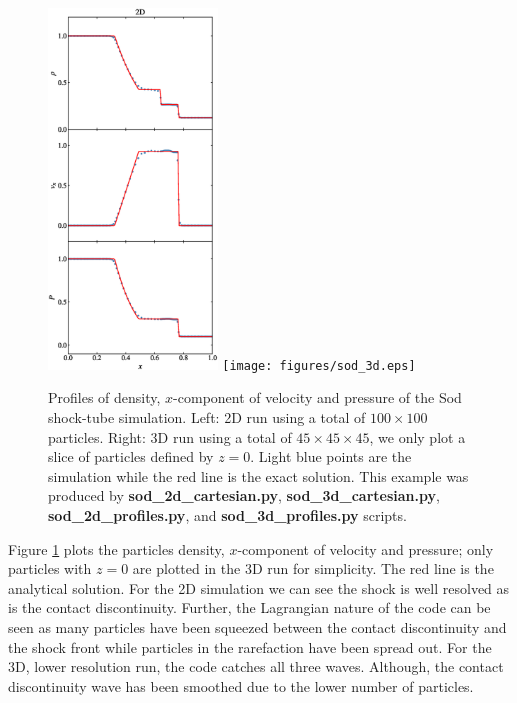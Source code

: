 \begin{figure}
    \begin{center}
        \includegraphics[width=0.4\textwidth]{figures/sod_2d.eps}
        \texttt{[image: figures/sod\_3d.eps]}
        \caption{Profiles of density, $x$-component of velocity and pressure of the Sod 
        shock-tube simulation. Left: 2D run using a total of $100\times100$ particles. Right: 3D run 
        using a total of $45\times45\times45$, we only plot a slice of particles defined by $z=0$.
        Light blue points are the simulation while the red line is the exact solution.
        This example was produced by \textbf{sod\_2d\_cartesian.py},
        \textbf{sod\_3d\_cartesian.py}, \textbf{sod\_2d\_profiles.py}, and 
        \textbf{sod\_3d\_profiles.py} scripts.}
        \label{fig.sod}
    \end{center}
\end{figure}

Figure \ref{fig.sod} plots the particles density, $x$-component of velocity and pressure; only 
particles with $z=0$ are plotted in the 3D run for simplicity. The red line is the analytical 
solution. For the 2D simulation we can see the shock is well resolved as is the contact 
discontinuity. Further, the Lagrangian nature of the code can be seen as many particles have been 
squeezed between the contact discontinuity and the shock front while particles in the rarefaction 
have been spread out. For the 3D, lower resolution run, the code catches all three waves. Although, 
the contact discontinuity wave has been smoothed due to the lower number of particles.


